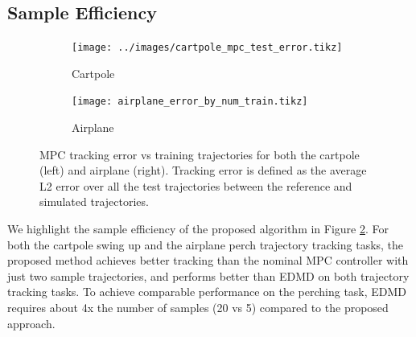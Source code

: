 \documentclass{article}
\begin{document}


\subsection{Sample Efficiency}
\begin{figure}[t]
  \centering
  \begin{subfigure}[t]{0.48\textwidth}
    \texttt{[image: ../images/cartpole\_mpc\_test\_error.tikz]}
    \caption{Cartpole}
    \label{fig:cartpole_mpc_test_error}
  \end{subfigure}
  \hfill
  \begin{subfigure}[t]{0.48\textwidth}
    \texttt{[image: airplane\_error\_by\_num\_train.tikz]}
    \caption{Airplane}
  \end{subfigure}
  \caption{MPC tracking error vs training trajectories for both the cartpole (left) and
  airplane (right). Tracking error is defined as the average L2 error over all the
  test trajectories between the reference and simulated trajectories.}
  \label{fig:sample_efficiency}
\end{figure}

We highlight the sample efficiency of the proposed algorithm in Figure 
\ref{fig:sample_efficiency}. For both the cartpole swing up and the airplane perch trajectory 
tracking tasks, the proposed method achieves better tracking than the nominal MPC controller
with just two sample trajectories, and performs better than EDMD on both 
trajectory tracking tasks. To achieve comparable performance on the perching task, EDMD 
requires about 4x the number of samples (20 vs 5) compared to the proposed approach.
\end{document}
